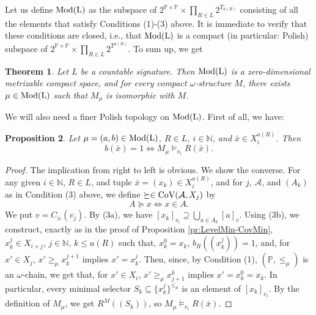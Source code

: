 \documentclass[12pt]{amsart}
\theoremstyle{plain}
\newtheorem{theorem}{Theorem}[section]
\newtheorem{proposition}[theorem]{\bf Proposition}
\newcommand \Val{{\rm{CoV}}}
\newcommand \Mod{\rm{Mod}}
\newcommand \NN{\mathbb{N}}
\newcommand \PPb{\mathbb{P}}
\begin{document}
Let us define $\Mod(L)$ as the subspace of $2^{\PPb \times \PPb} \times \prod_{R \in L}2^{T_{a(R)}}$ consisting of all the elements that satisfy Conditions (1)-(3) above.  It is immediate to verify that these conditions are closed, i.e., that $\Mod(L)$ is a compact (in particular: Polish) subspace of $2^{\PPb \times \PPb} \times \prod_{R \in L}2^{T^{a(R)}}$. To sum up, we get
	
	\begin{theorem}
		\label{th:ModIsEnough}
		Let $L$ be a countable signature. Then $\Mod(L)$ is a zero-dimensional metrizable compact space, and for every compact $\omega$-structure $M$, there exists $\mu \in \Mod(L)$ such that $M_\mu$ is isomorphic with $M$.
	\end{theorem}
	
	We will also need a finer Polish topology on $\Mod(L)$. First of all, we have:
	
\begin{proposition}
\label{pr:GoodBasis}
Let $\mu=(a,b) \in \Mod(L)$, $R \in L$, $i \in \NN$, and $\bar{x} \in X^{a(R)}_i$. Then $$b(\bar{x})=1 \iff M_\mu \vDash_{v_i} R(\bar{x}).$$
	
\end{proposition}
	
	\begin{proof}
		The implication from right to left is obvious. We show the converse. For any given $i \in \NN$, $R \in L$, and tuple $\bar{x}=(x_k) \in X^{a(R)}_i$, and for $j$, $\mathcal{A}$, and $(A_k)$ as in Condition (3) above, we define $\succeq \in \Val(\mathcal{A}, X_j)$ by 
		$$ A \succeq x \iff x \in A.$$
		We put $v=C_{\succeq}(v_j)$. By (3a), we have $[x_k]_{v_i} \supseteq \bigcup_{a \in A_k} [a]_v$. 
		Using (3b), we construct, exactly as in the proof of Proposition \ref{pr:LevelMin-CovMin}, $x^j_k \in X_{i+j}$, $j \in \NN$, $k \leq a(R)$ such that, $x^0_k=x_k$, $b_R((x^j_k))=1$, and, for  $x' \in X_j$, $x' \geq_\mu x^{j+1}_k$ implies $x'=x^j_k$.  Then, since, by Condition (1), $(\PPb,\leq_\mu)$ is an $\omega$-chain, we get that, for $x' \in X_i$, $x' \geq_\mu x^k_{j+1}$ implies $x'=x^0_k=x_k$. In particular, every minimal selector $S_k \subseteq \{x^j_k\}^{\leq_\mu}$ is an element of $[x_k]_{v_i}$. By the definition of $M_\mu$, we get $R^M((S_k))$, so $M_\mu \vDash_{v_i} R(\bar{x})$.
		
		
	\end{proof}
\end{document}
